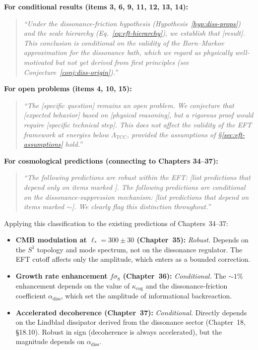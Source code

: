 \documentclass[12pt,openany]{book}
\theoremstyle{plain}
\theoremstyle{definition}
\theoremstyle{remark}
\begin{document}
\medskip
\noindent
\textbf{For conditional results (items 3, 6, 9, 11, 12, 13, 14):}
\begin{quote}
\itshape
``Under the dissonance-friction hypothesis
(Hypothesis~\ref{hyp:diss-props}) and the scale hierarchy
(Eq.~\ref{eq:eft-hierarchy}), we establish that [result].
This conclusion is conditional on the validity of the Born--Markov
approximation for the dissonance bath, which we regard as physically
well-motivated but not yet derived from first principles
(see Conjecture~\ref{conj:diss-origin}).''
\end{quote}

\medskip
\noindent
\textbf{For open problems (items 4, 10, 15):}
\begin{quote}
\itshape
``The [specific question] remains an open problem.  We conjecture that
[expected behavior] based on [physical reasoning], but a rigorous
proof would require [specific technical step].  This does not affect
the validity of the EFT framework at energies below
$\Lambda_{\mathrm{TCC}}$, provided the assumptions of
\S\ref{sec:eft-assumptions} hold.''
\end{quote}

\medskip
\noindent
\textbf{For cosmological predictions (connecting to Chapters 34--37):}
\begin{quote}
\itshape
``The following predictions are \emph{robust} within the EFT:
[list predictions that depend only on items marked \checkmark].
The following predictions are \emph{conditional} on the
dissonance-suppression mechanism:
[list predictions that depend on items marked $\boldsymbol{\sim}$].
We clearly flag this distinction throughout.''
\end{quote}

\medskip
\noindent
Applying this classification to the existing predictions of
Chapters~34--37:

\begin{itemize}
  \item \textbf{CMB modulation at $\ell_* = 300 \pm 30$
    (Chapter~35):}  \emph{Robust.}  Depends on the $S^{1}$
    topology and mode spectrum, not on the dissonance regulator.
    The EFT cutoff affects only the amplitude, which enters
    as a bounded correction.

  \item \textbf{Growth rate enhancement $f\sigma_8$ (Chapter~36):}
    \emph{Conditional.}  The $\sim 1\%$ enhancement depends on
    the value of $\kappa_{\mathrm{cog}}$ and the dissonance-friction
    coefficient $\alpha_{\mathrm{diss}}$, which set the amplitude
    of informational backreaction.

  \item \textbf{Accelerated decoherence (Chapter~37):}
    \emph{Conditional.}  Directly depends on the Lindblad dissipator
    derived from the dissonance sector (Chapter~18, \S18.10).
    Robust in sign (decoherence is always accelerated), but the
    magnitude depends on $\alpha_{\mathrm{diss}}$.
\end{itemize}
\end{document}
